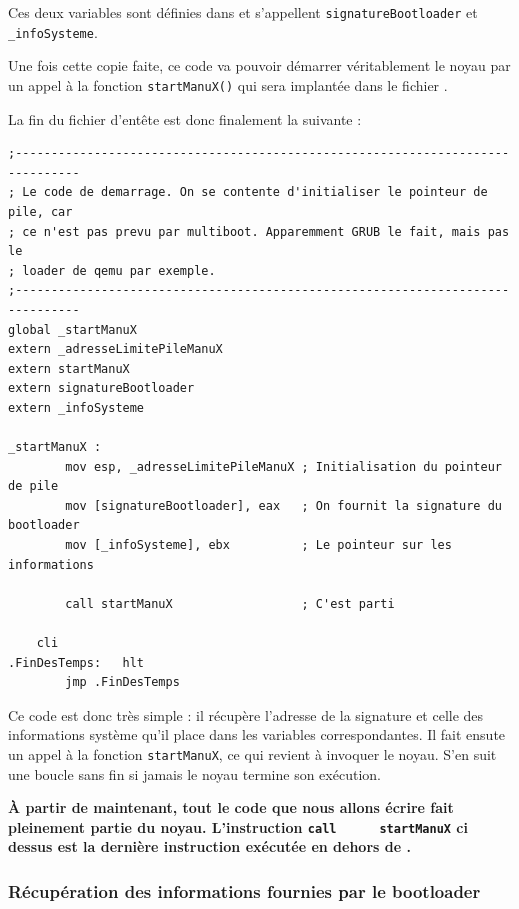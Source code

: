    Ces deux variables sont définies dans
 et s'appellent
\lstinline!signatureBootloader! et \lstinline!_infoSysteme!.
   
   Une fois cette copie faite, ce code va pouvoir démarrer
 véritablement le noyau par un appel à la fonction
\lstinline!startManuX()! qui sera implantée dans le fichier
.

   La fin du fichier d'entête est donc finalement la suivante :

\begin{lstlisting}
;-------------------------------------------------------------------------------
; Le code de demarrage. On se contente d'initialiser le pointeur de pile, car
; ce n'est pas prevu par multiboot. Apparemment GRUB le fait, mais pas le
; loader de qemu par exemple.
;-------------------------------------------------------------------------------
global _startManuX
extern _adresseLimitePileManuX
extern startManuX
extern signatureBootloader
extern _infoSysteme

_startManuX : 
        mov esp, _adresseLimitePileManuX ; Initialisation du pointeur de pile
        mov [signatureBootloader], eax   ; On fournit la signature du bootloader
        mov [_infoSysteme], ebx          ; Le pointeur sur les informations

        call startManuX                  ; C'est parti
 
	cli
.FinDesTemps:	hlt
        jmp .FinDesTemps
\end{lstlisting}

   Ce code est donc très simple : il récupère l'adresse de la
signature et celle des informations système qu'il place dans les
variables correspondantes. Il fait ensute un appel à la fonction
\lstinline!startManuX!, ce qui revient à invoquer le noyau. S'en suit
une boucle sans fin si jamais le noyau termine son exécution.

   {\bf À partir de maintenant, tout le code que nous allons écrire
     fait pleinement partie du noyau. L'instruction \lstinline!call
     startManuX! ci dessus est la dernière instruction exécutée en
     dehors de \manux.}
   
%
\subsubsection{Récupération des informations fournies par le bootloader}

